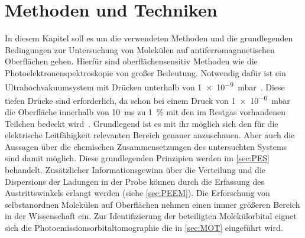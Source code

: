 \chapter{Methoden und Techniken} \label{cha:Methoden}
    In diesem Kapitel soll es um die verwendeten Methoden und die grundlegenden Bedingungen zur Untersuchung von Molekülen auf antiferromagnnetischen Oberflächen gehen.
    Hierfür sind oberflächensensitiv Methoden wie die Photoelektronenspektroskopie von großer Bedeutung.
    Notwendig dafür ist ein Ultrahochvakuumsystem mit Drücken unterhalb von \SI{1e-9}{\milli\bar}~\cite{Henzler}.
    Diese tiefen Drücke sind erforderlich, da schon bei einem Druck von \SI{1e-6}{\milli\bar} die Oberfläche innerhalb von \SI{10}{\milli\second} zu \SI{1}{\percent} mit den im Restgas vorhandenen Teilchen bedeckt wird~\cite{Henzler}.
    Grundlegend ist es mit ihr möglich sich den für die elektrische Leitfähigkeit relevanten Bereich genauer anzuschauen. 
    Aber auch die Aussagen über die chemischen Zusammensetzungen des untersuchten Systems sind damit möglich.
    Diese grundlegenden Prinzipien werden im \autoref{sec:PES} behandelt.
    Zusätzlicher Informationsgewinn über die Verteilung und die Dispersions der Ladungen in der Probe können durch die Erfassung des Austrittswinkels erlangt werden (siehe \autoref{sec:PEEM}).
    Die Erforschung von selbstanordnen Molekülen auf Oberflächen nehmen einen immer größeren Bereich in der Wissenschaft ein. 
    Zur Identifizierung der beteiligten Molekülorbital eignet sich die Photoemissionsorbitaltomographie die in \autoref{sec:MOT} eingeführt wird.

